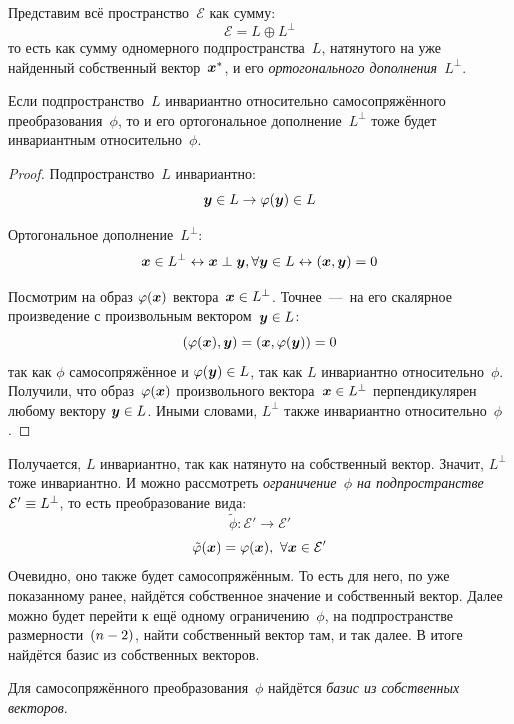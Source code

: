 \documentclass[a4paper,12pt]{article}
\theoremstyle{remark}
\begin{document}
  Представим всё пространство~$\mathcal E$ как сумму:
  \[
    \mathcal E = L \oplus L^{\perp}
  \]
  то есть как сумму одномерного подпространства~$L$, натянутого на уже найденный собственный вектор~$\boldsymbol x^*$, и его \emph{ортогонального дополнения~$L^{\perp}$}.
  
  \begin{proposition}
    Если подпространство~$L$ инвариантно относительно самосопряжённого преобразования~$\phi$, то и его ортогональное дополнение~$L^{\perp}$ тоже будет инвариантным относительно~$\phi$.
  \end{proposition}
  
  \begin{proof}
    Подпространство~$L$ инвариантно:
    \[
      \boldsymbol y \in L \rightarrow \varphi(\boldsymbol y) \in L
    \]
    
    Ортогональное дополнение~$L^{\perp}$:
    \[
      \boldsymbol x \in L^{\perp}
      \leftrightarrow \boldsymbol x \perp \boldsymbol y, \forall \boldsymbol y \in L
      \leftrightarrow (\boldsymbol x, \boldsymbol y) = 0
    \]
    
    Посмотрим на образ $\varphi(\boldsymbol x)$ вектора~$\bds x \hm\in L^{\perp}$.
    Точнее~---~на его скалярное произведение с произвольным вектором~$\bds y \hm\in L$:
    \[
      (\varphi(\boldsymbol x), \boldsymbol y) = (\boldsymbol x, \varphi(\boldsymbol y)) = 0
    \]
    так как $\phi$ самосопряжённое и $\phi(\bds y) \hm\in L$, так как $L$ инвариантно относительно~$\phi$.
    Получили, что образ~$\varphi(\boldsymbol x)$ произвольного вектора~$\bds x \hm\in L^{\perp}$ перпендикулярен любому вектору $\bds y \hm\in L$.
    Иными словами, $L^{\perp}$ также инвариантно относительно~$\phi$.
  \end{proof}
  
  Получается, $L$ инвариантно, так как натянуто на собственный вектор.
  Значит, $L^{\perp}$ тоже инвариантно.
  И можно рассмотреть \emph{ограничение~$\phi$ на подпространстве~$\mathcal E' \hm\equiv L^{\perp}$}, то есть преобразование вида:
  \[
    \tilde\phi\colon \mathcal E' \to \mathcal E'
  \]
  \[
    \tilde{\varphi}(\boldsymbol x) = \varphi(\boldsymbol x),\ \forall \boldsymbol x \in \mathcal E'
  \]
  Очевидно, оно также будет самосопряжённым.
  То есть для него, по уже показанному ранее, найдётся собственное значение и собственный вектор.
  Далее можно будет перейти к ещё одному ограничению~$\phi$, на подпространстве размерности~$(n \hm- 2)$, найти собственный вектор там, и так далее.
  В итоге найдётся базис из собственных векторов.
  
  \begin{theorem}\label{theo:basis-exists}
    Для самосопряжённого преобразования~$\phi$ найдётся \emph{базис из собственных векторов}.
  \end{theorem}
\end{document}
